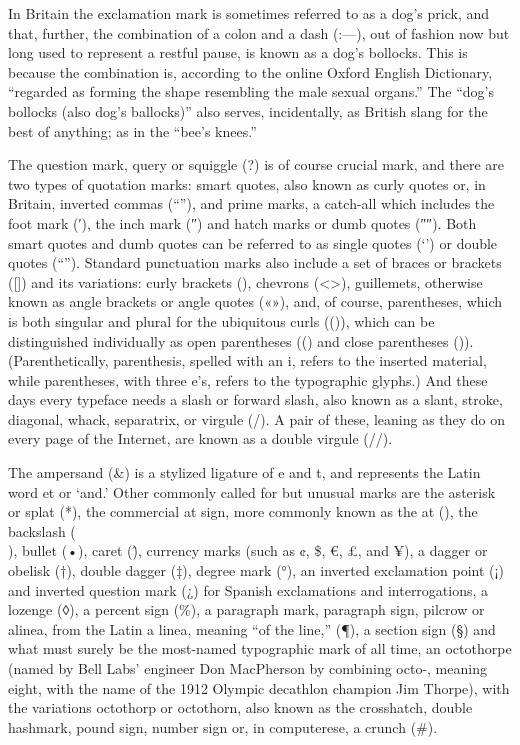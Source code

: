 \documentclass[12pt,a4paper,twocolumn]{book} %
\begin{document}
In Britain the exclamation mark is sometimes referred to as a dog’s prick, and that, further, the combination of a colon and a dash (:—), out of fashion now but long used to represent a restful pause, is known as a dog’s bollocks. This is because the combination is, according to the online Oxford English Dictionary, “regarded as forming the shape resembling the male sexual organs.” The “dog’s bollocks (also dog’s ballocks)” also serves, incidentally, as British slang for the best of anything; as in the “bee’s knees.”

The question mark, query or squiggle (?) is of course crucial mark, and there are two types of quotation marks: smart quotes, also known as curly quotes or, in Britain, inverted commas (“”), and prime marks, a catch-all which includes the foot mark (′), the inch mark (″) and hatch marks or dumb quotes (″″). Both smart quotes and dumb quotes can be referred to as single quotes (‘’) or double quotes (“”). Standard punctuation marks also include a set of braces or brackets ([]) and its variations: curly brackets ({}), chevrons (<>), guillemets, otherwise known as angle brackets or angle quotes («»), and, of course, parentheses, which is both singular and plural for the ubiquitous curls (()), which can be distinguished individually as open parentheses (() and close parentheses ()). (Parenthetically, parenthesis, spelled with an i, refers to the inserted material, while parentheses, with three e’s, refers to the typographic glyphs.) And these days every typeface needs a slash or forward slash, also known as a slant, stroke, diagonal, whack, separatrix, or virgule (/). A pair of these, leaning as they do on every page of the Internet, are known as a double virgule (//).

The ampersand (\&) is a stylized ligature of e and t, and represents the Latin word et or ‘and.’ Other commonly called for but unusual marks are the asterisk or splat (*), the commercial at sign, more commonly known as the at (\@), the backslash (\\), bullet (•), caret (\^), currency marks (such as ¢, \$, €, £, and ¥), a dagger or obelisk (†), double dagger (‡), degree mark (°), an inverted exclamation point (¡) and inverted question mark (¿) for Spanish exclamations and interrogations, a lozenge (◊), a percent sign (\%), a paragraph mark, paragraph sign, pilcrow or alinea, from the Latin a linea, meaning “of the line,” (¶), a section sign (§) and what must surely be the most-named typographic mark of all time, an octothorpe (named by Bell Labs’ engineer Don MacPherson by combining octo-, meaning eight, with the name of the 1912 Olympic decathlon champion Jim Thorpe), with the variations octothorp or octothorn, also known as the crosshatch, double hashmark, pound sign, number sign or, in computerese, a crunch (\#).
\end{document}
